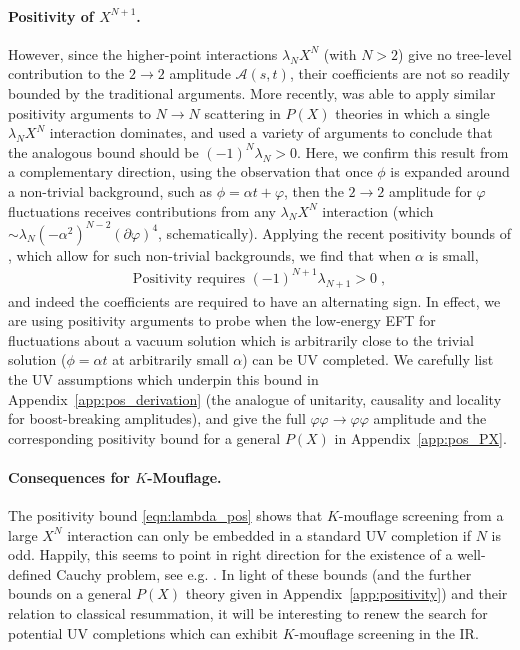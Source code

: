 \documentclass[11pt]{article}
\begin{document}
\paragraph{Positivity of $X^{N+1}$.}
However, since the higher-point interactions $\lambda_N X^N$ (with $N > 2$) give no tree-level contribution to the $2\to 2$ amplitude $\mathcal{A} (s,t)$, their coefficients are not so readily bounded by the traditional arguments.
More recently, \cite{Chandrasekaran:2018qmx} was able to apply similar positivity arguments to $N \to N$ scattering in $P(X)$ theories in which a single $\lambda_N X^N$ interaction dominates, and used a variety of arguments to conclude that the analogous bound should be $(-1)^N \lambda_N > 0$. 
Here, we confirm this result from a complementary direction, using the observation that once $\phi$ is expanded around a non-trivial background, such as $\phi = \alpha t + \varphi$, then the $2 \to 2$ amplitude for $\varphi$ fluctuations receives contributions from any $\lambda_N X^N$ interaction (which $\sim \lambda_N (-\alpha^2)^{N-2} (\partial \varphi)^4 $, schematically). 
Applying the recent positivity bounds of \cite{Grall:2021xxm}, which allow for such non-trivial backgrounds, we find that when $\alpha$ is small, 
\begin{align}
  \text{Positivity requires } (-1)^{N+1} \lambda_{N+1} > 0 \; ,
\label{eqn:lambda_pos}
\end{align}
and indeed the coefficients are required to have an alternating sign. 
In effect, we are using positivity arguments to probe when the low-energy EFT for fluctuations about a vacuum solution which is arbitrarily close to the trivial solution ($\phi = \alpha t$ at arbitrarily small $\alpha$) can be UV completed. 
We carefully list the UV assumptions which underpin this bound in Appendix~\ref{app:pos_derivation} (the analogue of unitarity, causality and locality for boost-breaking amplitudes), and give the full $\varphi \varphi \to \varphi \varphi$ amplitude and the corresponding positivity bound for a general $P(X)$ in Appendix~\ref{app:pos_PX}.


\paragraph{Consequences for $K$-Mouflage.}
The positivity bound \eqref{eqn:lambda_pos} shows that $K$-mouflage screening from a large $X^{N}$ interaction can only be embedded in a standard UV completion if $N$ is odd. 
Happily, this seems to point in right direction for the existence of a well-defined Cauchy problem, see e.g. \cite{Akhoury:2011hr, Leonard:2011ce, Bernard:2019fjb, Figueras:2020dzx, Bezares:2020wkn}. 
In light of these bounds (and the further bounds on a general $P(X)$ theory given in Appendix~\ref{app:positivity}) and their relation to classical resummation, it will be interesting to renew the search for potential UV completions which can exhibit $K$-mouflage screening in the IR. 
\end{document}
